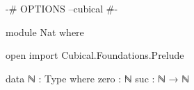 \begin{code}[hide]
{-# OPTIONS --cubical #-}

module Nat where

open import Cubical.Foundations.Prelude
\end{code}
\begin{code}
data ℕ : Type where
  zero  : ℕ
  suc   : ℕ → ℕ
\end{code}
